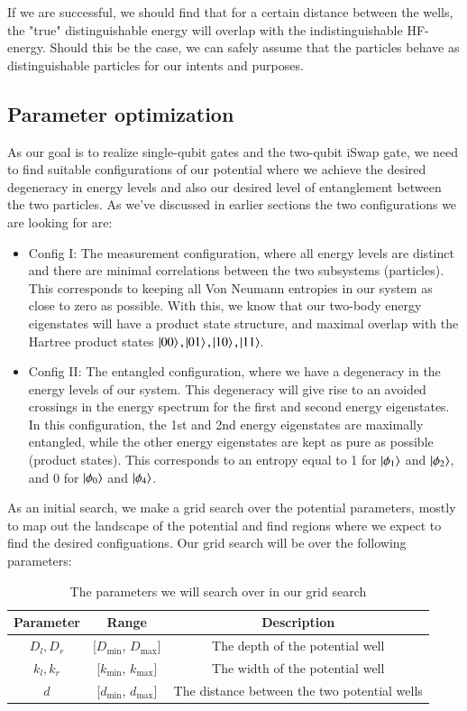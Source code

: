 \documentclass{subfiles}
\begin{document}
If we are successful, we should find that for a certain distance between the wells, the "true" distinguishable energy will overlap with the indistinguishable HF-energy. Should this be the case, we can safely assume that the particles behave as distinguishable particles for our intents and purposes. 


\subsection{Parameter optimization}\label{sec:optimization_procedure}
As our goal is to realize single-qubit gates and the two-qubit iSwap gate, we need to find suitable configurations of our potential where we achieve the desired degeneracy in energy levels and also our desired level of entanglement between the two particles. As we've discussed in earlier sections the two configurations we are looking for are:
\begin{itemize}
    \item Config I: The measurement configuration, where all energy levels are distinct and there are minimal correlations between the two subsystems (particles). This corresponds to keeping all Von Neumann entropies in our system as close to zero as possible. With this, we know that our two-body energy eigenstates will have a product state structure, and maximal overlap with the Hartree product states $\ket{00}, \ket{01}, \ket{10}, \ket{11}$.
    \item Config II: The entangled configuration, where we have a degeneracy in the energy levels of our system. This degeneracy will give rise to an avoided crossings in the energy spectrum for the first and second energy eigenstates. In this configuration, the 1st and 2nd energy eigenstates are maximally entangled, while the other energy eigenstates are kept as pure as possible (product states). This corresponds to an entropy equal to 1 for $\ket{\phi_1}$ and $\ket{\phi_2}$, and 0 for $\ket{\phi_0}$ and $\ket{\phi_4}$. 
\end{itemize}
As an initial search, we make a grid search over the potential parameters, mostly to map out the landscape of the potential and find regions where we expect to find the desired configuations. Our grid search will be over the following parameters:
\begin{table}
    \centering
    \begin{tabular}{|c|c|c|}
        \hline
        Parameter & Range & Description \\
        \hline
        $D_l, D_r$ & [$D_{\text{min}}$, $D_{\text{max}}$] & The depth of the potential well \\
        $k_l, k_r$ & [$k_{\text{min}}$, $k_{\text{max}}$] & The width of the potential well \\
        $d$ & [$d_{\text{min}}$, $d_{\text{max}}$] & The distance between the two potential wells \\
        \hline
    \end{tabular}
    \caption{The parameters we will search over in our grid search}
\end{table}
\end{document}
